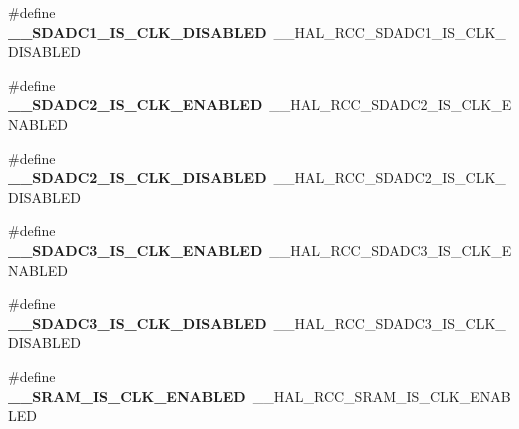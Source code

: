 \begin{DoxyCompactItemize}
\item 
\hypertarget{group___h_a_l___r_c_c___aliased_ga2dfed9a0fbfa7be8f90c4e3ce72c25fe}{\#define {\bfseries \-\_\-\-\_\-\-S\-D\-A\-D\-C1\-\_\-\-I\-S\-\_\-\-C\-L\-K\-\_\-\-D\-I\-S\-A\-B\-L\-E\-D}~\-\_\-\-\_\-\-H\-A\-L\-\_\-\-R\-C\-C\-\_\-\-S\-D\-A\-D\-C1\-\_\-\-I\-S\-\_\-\-C\-L\-K\-\_\-\-D\-I\-S\-A\-B\-L\-E\-D}\label{group___h_a_l___r_c_c___aliased_ga2dfed9a0fbfa7be8f90c4e3ce72c25fe}

\item 
\hypertarget{group___h_a_l___r_c_c___aliased_gaeb4574351930d88897bc5929cdc6dc0a}{\#define {\bfseries \-\_\-\-\_\-\-S\-D\-A\-D\-C2\-\_\-\-I\-S\-\_\-\-C\-L\-K\-\_\-\-E\-N\-A\-B\-L\-E\-D}~\-\_\-\-\_\-\-H\-A\-L\-\_\-\-R\-C\-C\-\_\-\-S\-D\-A\-D\-C2\-\_\-\-I\-S\-\_\-\-C\-L\-K\-\_\-\-E\-N\-A\-B\-L\-E\-D}\label{group___h_a_l___r_c_c___aliased_gaeb4574351930d88897bc5929cdc6dc0a}

\item 
\hypertarget{group___h_a_l___r_c_c___aliased_ga81f339353e933bdc48a36ef318981a45}{\#define {\bfseries \-\_\-\-\_\-\-S\-D\-A\-D\-C2\-\_\-\-I\-S\-\_\-\-C\-L\-K\-\_\-\-D\-I\-S\-A\-B\-L\-E\-D}~\-\_\-\-\_\-\-H\-A\-L\-\_\-\-R\-C\-C\-\_\-\-S\-D\-A\-D\-C2\-\_\-\-I\-S\-\_\-\-C\-L\-K\-\_\-\-D\-I\-S\-A\-B\-L\-E\-D}\label{group___h_a_l___r_c_c___aliased_ga81f339353e933bdc48a36ef318981a45}

\item 
\hypertarget{group___h_a_l___r_c_c___aliased_ga41a9d65373a84607fc66101cb870a848}{\#define {\bfseries \-\_\-\-\_\-\-S\-D\-A\-D\-C3\-\_\-\-I\-S\-\_\-\-C\-L\-K\-\_\-\-E\-N\-A\-B\-L\-E\-D}~\-\_\-\-\_\-\-H\-A\-L\-\_\-\-R\-C\-C\-\_\-\-S\-D\-A\-D\-C3\-\_\-\-I\-S\-\_\-\-C\-L\-K\-\_\-\-E\-N\-A\-B\-L\-E\-D}\label{group___h_a_l___r_c_c___aliased_ga41a9d65373a84607fc66101cb870a848}

\item 
\hypertarget{group___h_a_l___r_c_c___aliased_ga730e65c79c630f9fcc26822a8935e5c3}{\#define {\bfseries \-\_\-\-\_\-\-S\-D\-A\-D\-C3\-\_\-\-I\-S\-\_\-\-C\-L\-K\-\_\-\-D\-I\-S\-A\-B\-L\-E\-D}~\-\_\-\-\_\-\-H\-A\-L\-\_\-\-R\-C\-C\-\_\-\-S\-D\-A\-D\-C3\-\_\-\-I\-S\-\_\-\-C\-L\-K\-\_\-\-D\-I\-S\-A\-B\-L\-E\-D}\label{group___h_a_l___r_c_c___aliased_ga730e65c79c630f9fcc26822a8935e5c3}

\item 
\hypertarget{group___h_a_l___r_c_c___aliased_gaa705610d5a659ed552f87a6d6dc8af1a}{\#define {\bfseries \-\_\-\-\_\-\-S\-R\-A\-M\-\_\-\-I\-S\-\_\-\-C\-L\-K\-\_\-\-E\-N\-A\-B\-L\-E\-D}~\-\_\-\-\_\-\-H\-A\-L\-\_\-\-R\-C\-C\-\_\-\-S\-R\-A\-M\-\_\-\-I\-S\-\_\-\-C\-L\-K\-\_\-\-E\-N\-A\-B\-L\-E\-D}\label{group___h_a_l___r_c_c___aliased_gaa705610d5a659ed552f87a6d6dc8af1a}


\end{DoxyCompactItemize}
